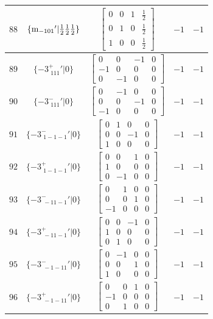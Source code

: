 \documentclass[fleqn,8pt]{jsarticle}
\begin{document}
\begin{longtable}{ccccc}
$ 88 $ & $ \{{\rm m}_{-101}{}'|\frac{1}{2} \frac{1}{2} \frac{1}{2}\} $ & $ \begin{bmatrix} 0 & 0 & 1 & \frac{1}{2} \\ 0 & 1 & 0 & \frac{1}{2} \\ 1 & 0 & 0 & \frac{1}{2} \end{bmatrix} $ & $ -1 $ & $ -1 $ \\ \hline
$ 89 $ & $ \{-3^{+}_{\,\,111}{}'|0\} $ & $ \begin{bmatrix} 0 & 0 & -1 & 0 \\ -1 & 0 & 0 & 0 \\ 0 & -1 & 0 & 0 \end{bmatrix} $ & $ -1 $ & $ -1 $ \\ \hline
$ 90 $ & $ \{-3^{-}_{\,\,111}{}'|0\} $ & $ \begin{bmatrix} 0 & -1 & 0 & 0 \\ 0 & 0 & -1 & 0 \\ -1 & 0 & 0 & 0 \end{bmatrix} $ & $ -1 $ & $ -1 $ \\ \hline
$ 91 $ & $ \{-3^{-}_{\,\,1-1-1}{}'|0\} $ & $ \begin{bmatrix} 0 & 1 & 0 & 0 \\ 0 & 0 & -1 & 0 \\ 1 & 0 & 0 & 0 \end{bmatrix} $ & $ -1 $ & $ -1 $ \\ \hline
$ 92 $ & $ \{-3^{+}_{\,\,1-1-1}{}'|0\} $ & $ \begin{bmatrix} 0 & 0 & 1 & 0 \\ 1 & 0 & 0 & 0 \\ 0 & -1 & 0 & 0 \end{bmatrix} $ & $ -1 $ & $ -1 $ \\ \hline
$ 93 $ & $ \{-3^{-}_{\,\,-11-1}{}'|0\} $ & $ \begin{bmatrix} 0 & 1 & 0 & 0 \\ 0 & 0 & 1 & 0 \\ -1 & 0 & 0 & 0 \end{bmatrix} $ & $ -1 $ & $ -1 $ \\ \hline
$ 94 $ & $ \{-3^{+}_{\,\,-11-1}{}'|0\} $ & $ \begin{bmatrix} 0 & 0 & -1 & 0 \\ 1 & 0 & 0 & 0 \\ 0 & 1 & 0 & 0 \end{bmatrix} $ & $ -1 $ & $ -1 $ \\ \hline
$ 95 $ & $ \{-3^{-}_{\,\,-1-11}{}'|0\} $ & $ \begin{bmatrix} 0 & -1 & 0 & 0 \\ 0 & 0 & 1 & 0 \\ 1 & 0 & 0 & 0 \end{bmatrix} $ & $ -1 $ & $ -1 $ \\ \hline
$ 96 $ & $ \{-3^{+}_{\,\,-1-11}{}'|0\} $ & $ \begin{bmatrix} 0 & 0 & 1 & 0 \\ -1 & 0 & 0 & 0 \\ 0 & 1 & 0 & 0 \end{bmatrix} $ & $ -1 $ & $ -1 $ \\
\end{longtable}
\end{document}
